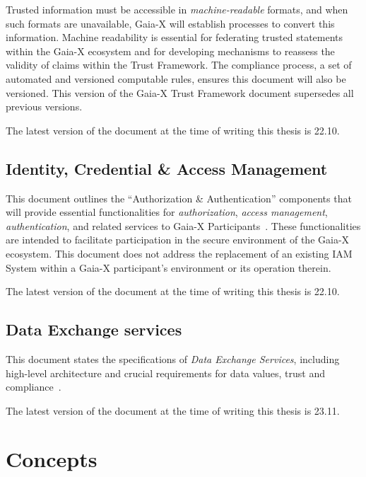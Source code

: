 Trusted information must be accessible in \textit{machine-readable} formats, and when such formats are unavailable, Gaia-X will establish processes to convert this information.
Machine readability is essential for federating trusted statements within the Gaia-X ecosystem and for developing mechanisms to reassess the validity of claims within the Trust Framework.
The compliance process, a set of automated and versioned computable rules, ensures this document will also be versioned.
This version of the Gaia-X Trust Framework document supersedes all previous versions.

The latest version of the document at the time of writing this thesis is 22.10.

\subsection{Identity, Credential \& Access Management}\label{subsec:identity-credential-&-access-management}

This document outlines the ``Authorization \& Authentication'' components that will provide essential functionalities for \textit{authorization}, \textit{access management}, \textit{authentication}, and related services to Gaia-X Participants~\cite{gaiax_identity_and_access_management}.
These functionalities are intended to facilitate participation in the secure environment of the Gaia-X ecosystem.
This document does not address the replacement of an existing IAM System within a Gaia-X participant's environment or its operation therein.

The latest version of the document at the time of writing this thesis is 22.10.

\subsection{Data Exchange services}\label{subsec:data-exchange-services}

This document states the specifications of \textit{Data Exchange Services}, including high-level architecture and crucial requirements for data values, trust and compliance~\cite{gaiax_data_exchange_document}.

The latest version of the document at the time of writing this thesis is 23.11.

\section{Concepts}\label{sec:concepts}


